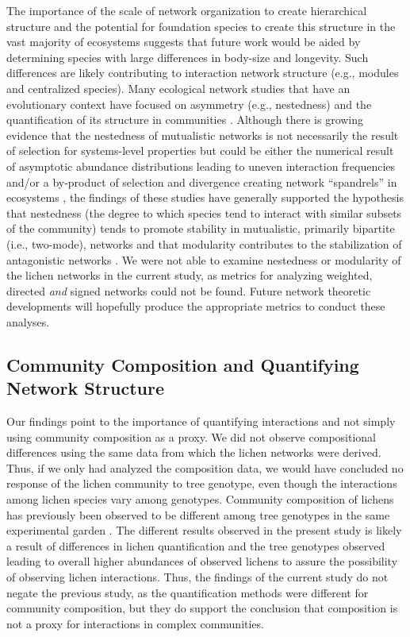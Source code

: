 \documentclass[fleqn,12pt]{olplainarticle}
\begin{document}
The importance of the scale of network organization to create
hierarchical structure \citep{Guimaraes2020TheOrganization} and the
potential for foundation species to create this structure in the vast
majority of ecosystems \citep{Ellison2005, Whitham2006a} suggests that
future work would be aided by determining species with large
differences in body-size and longevity. Such differences are likely
contributing to interaction network structure (e.g., modules and
centralized species). Many ecological network studies that have an
evolutionary context have focused on asymmetry (e.g., nestedness) and
the quantification of its structure in communities
\citep{Bascompte2006, Diaz-Castelazo2010, Guimaraes2011,
  Thompson2013}. Although there is growing evidence that the
nestedness of mutualistic networks is not necessarily the result of
selection for systems-level properties but could be either the
numerical result of asymptotic abundance distributions leading to
uneven interaction frequencies \citep{Staniczenko2013TheNetworks}
and/or a by-product of selection and divergence creating network
``spandrels'' in ecosystems \citep{Valverde2018TheSpandrel}, the
findings of these studies have generally supported the hypothesis that
nestedness (the degree to which species tend to interact with similar
subsets of the community) tends to promote stability in mutualistic,
primarily bipartite (i.e., two-mode), networks and that modularity
contributes to the stabilization of antagonistic networks
\citep{Elias2013EvolutionaryNetwork,
  Grilli2016ModularityCommunities}. We were not able to examine
nestedness or modularity of the lichen networks in the current study,
as metrics for analyzing weighted, directed \textit{and} signed
networks could not be found. Future network theoretic developments
will hopefully produce the appropriate metrics to conduct these
analyses.

\subsection*{Community Composition and Quantifying Network Structure}

Our findings point to the importance of quantifying interactions and
not simply using community composition as a proxy. We did not observe
compositional differences using the same data from which the lichen
networks were derived. Thus, if we only had analyzed the composition
data, we would have concluded no response of the lichen community to
tree genotype, even though the interactions among lichen species vary
among genotypes. Community composition of lichens has previously been
observed to be different among tree genotypes in the same experimental
garden \citep{Lamit2011, Lamit2015a}. The different results observed
in the present study is likely a result of differences in lichen
quantification and the tree genotypes observed leading to overall
higher abundances of observed lichens to assure the possibility of
observing lichen interactions. Thus, the findings of the current study
do not negate the previous study, as the quantification methods were
different for community composition, but they do support the
conclusion that composition is not a proxy for interactions in complex
communities.
\end{document}

